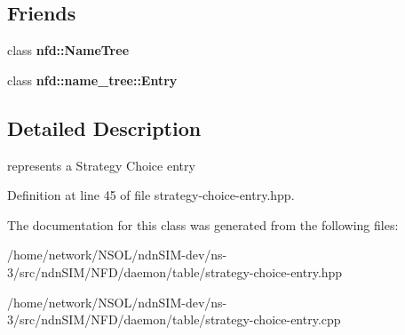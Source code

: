 \subsection*{Friends}
\begin{DoxyCompactItemize}
\item 
class {\bfseries nfd\+::\+Name\+Tree}\hypertarget{classnfd_1_1strategy__choice_1_1Entry_a6c9695e8b2951b18e0243f6b40a26735}{}\label{classnfd_1_1strategy__choice_1_1Entry_a6c9695e8b2951b18e0243f6b40a26735}

\item 
class {\bfseries nfd\+::name\+\_\+tree\+::\+Entry}\hypertarget{classnfd_1_1strategy__choice_1_1Entry_a79163783eb509656535bce49e536ba56}{}\label{classnfd_1_1strategy__choice_1_1Entry_a79163783eb509656535bce49e536ba56}

\end{DoxyCompactItemize}


\subsection{Detailed Description}
represents a Strategy Choice entry 

Definition at line 45 of file strategy-\/choice-\/entry.\+hpp.



The documentation for this class was generated from the following files\+:\begin{DoxyCompactItemize}
\item 
/home/network/\+N\+S\+O\+L/ndn\+S\+I\+M-\/dev/ns-\/3/src/ndn\+S\+I\+M/\+N\+F\+D/daemon/table/strategy-\/choice-\/entry.\+hpp\item 
/home/network/\+N\+S\+O\+L/ndn\+S\+I\+M-\/dev/ns-\/3/src/ndn\+S\+I\+M/\+N\+F\+D/daemon/table/strategy-\/choice-\/entry.\+cpp\end{DoxyCompactItemize}
